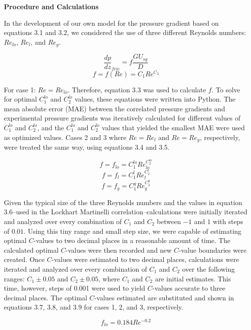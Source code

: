 \documentclass[10pt]{article}
\begin{document}
\textbf{Procedure and Calculations}

In the development of our own model for the pressure gradient based on equations 3.1 and 3.2, we considered the use of three different Reynolds numbers: \(Re_{lo}\), \(Re_l\), and \(Re_g\). 

\[\frac{dp}{dz}_{fric}=f\frac{GU_{sg}}{D}\]
\[f=f(Re)=C_1Re^{C_2}\]

For case 1: \(Re=Re_{lo}\). Therefore, equation 3.3 was used to calculate \(f\). To solve for optimal \(C_1^{lo}\) and \(C_2^{lo}\) values, these equations were written into Python. The mean absolute error (MAE) between the correlated pressure gradients and experimental pressure gradients was iteratively calculated for different values of \(C_1^{lo}\) and \(C_2^{lo}\), and the \(C_1^{lo}\) and \(C_2^{lo}\) values that yielded the smallest MAE were used as optimized values. Cases 2 and 3 where \(Re=Re_l\) and \(Re=Re_g\), respectively, were treated the same way, using equations 3.4 and 3.5.

\[f=f_{lo} = C_1^{lo}Re_{lo}^{C_2^{lo}}\]
\[f=f_l = C_1^lRe_l^{C_2^l}\]
\[f=f_g = C_1^gRe_g^{C_2^g}\]

Given the typical size of the three Reynolds numbers and the values in equation 3.6--used in the Lockhart Martinelli correlation--calculations were initially iterated and analyzed over every combination of \(C_1\) and \(C_2\) between \(-1\) and \(1\) with steps of \(0.01\). Using this tiny range and small step size, we were capable of estimating optimal \(C\)-values to two decimal places in a reasonable amount of time. The calculated optimal \(C\)-values were then recorded and new \(C\)-value boundaries were created. Once \(C\)-values were estimated to two decimal places, calculations were iterated and analyzed over every combination of \(C_1\) and \(C_2\) over the following ranges: \(C_1\pm 0.05\) and \(C_2\pm 0.05\), where \(C_1\) and \(C_2\) are initial estimates. This time, however, steps of 0.001 were used to yield \(C\)-values accurate to three decimal places. The optimal \(C\)-values estimated are substituted and shown in equations 3.7, 3.8, and 3.9 for cases 1, 2, and 3, respectively.

\[f_{lo}=0.184Re^{-0.2}\]
\end{document}
